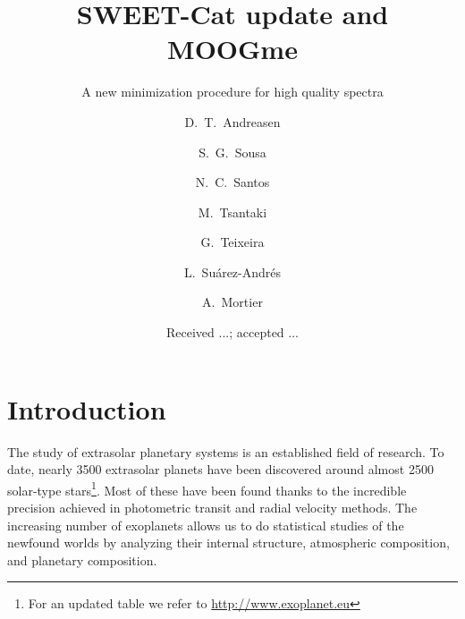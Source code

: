 \documentclass{aa}
\begin{document}
\title{SWEET-Cat update and MOOGme}
\subtitle{A new minimization procedure for high quality spectra}


\author{ D.~T.~Andreasen
    \and S.~G.~Sousa
    \and N.~C.~Santos
    \and M.~Tsantaki
    \and G.~Teixeira
    \and L.~Su\'arez-Andr\'es
    \and A.~Mortier
}







\date{Received ...; accepted ...}

\abstract
{}
{}
{}
{}
{}



\maketitle



\section{Introduction}
\label{sec:introduction}
The study of extrasolar planetary systems is an established field of research.
To date, nearly 3500 extrasolar planets have been discovered around almost 2500
solar-type stars\footnote{For an updated table we refer to
\url{http://www.exoplanet.eu}}. Most of these have been found thanks to the
incredible precision achieved in photometric transit and radial velocity
methods. The increasing number of exoplanets allows us to do statistical studies
of the newfound worlds by analyzing their internal structure, atmospheric
composition, and planetary composition.
\end{document}
